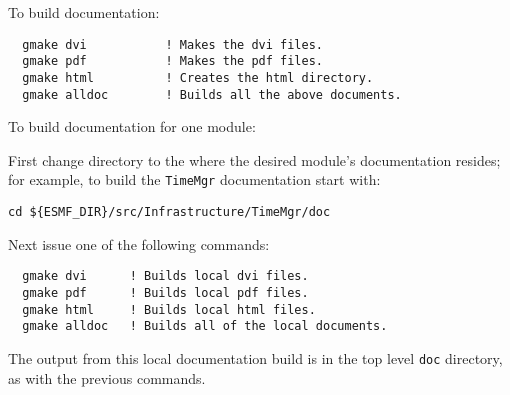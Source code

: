 \noindent To build documentation:
\begin{verbatim}
  gmake dvi           ! Makes the dvi files.
  gmake pdf           ! Makes the pdf files.
  gmake html          ! Creates the html directory.
  gmake alldoc        ! Builds all the above documents.
\end{verbatim}

\noindent To build documentation for one module:

\noindent First change directory to the where the desired module's documentation resides;  for
example, to build the {\tt TimeMgr} documentation start with:

\begin{verbatim}
cd ${ESMF_DIR}/src/Infrastructure/TimeMgr/doc
\end{verbatim}

\noindent Next issue one of the following commands:
\begin{verbatim}
  gmake dvi      ! Builds local dvi files.
  gmake pdf      ! Builds local pdf files.
  gmake html     ! Builds local html files.
  gmake alldoc   ! Builds all of the local documents.
\end{verbatim}

\noindent The output from this local documentation build is in the top level {\tt doc}
directory, as with the previous commands.






